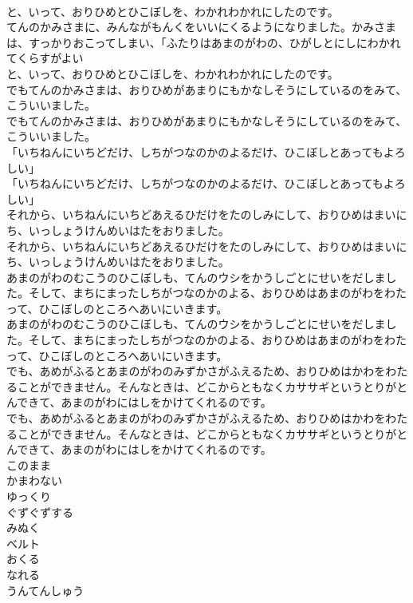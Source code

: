 \documentclass[8pt]{extreport}
\begin{document}
\begin{CJK}{UTF8}{min}
\\	と、いって、おりひめとひこぼしを、わかれわかれにしたのです。
\\	てんのかみさまに、みんながもんくをいいにくるようになりました。かみさまは、すっかりおこってしまい、「ふたりはあまのがわの、ひがしとにしにわかれてくらすがよい
\\	と、いって、おりひめとひこぼしを、わかれわかれにしたのです。
\\	でもてんのかみさまは、おりひめがあまりにもかなしそうにしているのをみて、こういいました。
\\	でもてんのかみさまは、おりひめがあまりにもかなしそうにしているのをみて、こういいました。
\\	「いちねんにいちどだけ、しちがつなのかのよるだけ、ひこぼしとあってもよろしい」
\\	「いちねんにいちどだけ、しちがつなのかのよるだけ、ひこぼしとあってもよろしい」
\\	それから、いちねんにいちどあえるひだけをたのしみにして、おりひめはまいにち、いっしょうけんめいはたをおりました。
\\	それから、いちねんにいちどあえるひだけをたのしみにして、おりひめはまいにち、いっしょうけんめいはたをおりました。
\\	あまのがわのむこうのひこぼしも、てんのウシをかうしごとにせいをだしました。そして、まちにまったしちがつなのかのよる、おりひめはあまのがわをわたって、ひこぼしのところへあいにいきます。
\\	あまのがわのむこうのひこぼしも、てんのウシをかうしごとにせいをだしました。そして、まちにまったしちがつなのかのよる、おりひめはあまのがわをわたって、ひこぼしのところへあいにいきます。
\\	でも、あめがふるとあまのがわのみずかさがふえるため、おりひめはかわをわたることができません。そんなときは、どこからともなくカササギというとりがとんできて、あまのがわにはしをかけてくれるのです。
\\	でも、あめがふるとあまのがわのみずかさがふえるため、おりひめはかわをわたることができません。そんなときは、どこからともなくカササギというとりがとんできて、あまのがわにはしをかけてくれるのです。
\\	このまま
\\	かまわない
\\	ゆっくり
\\	ぐずぐずする
\\	みぬく
\\	ベルト
\\	おくる
\\	なれる
\\	うんてんしゅう

\end{CJK}
\end{document}

